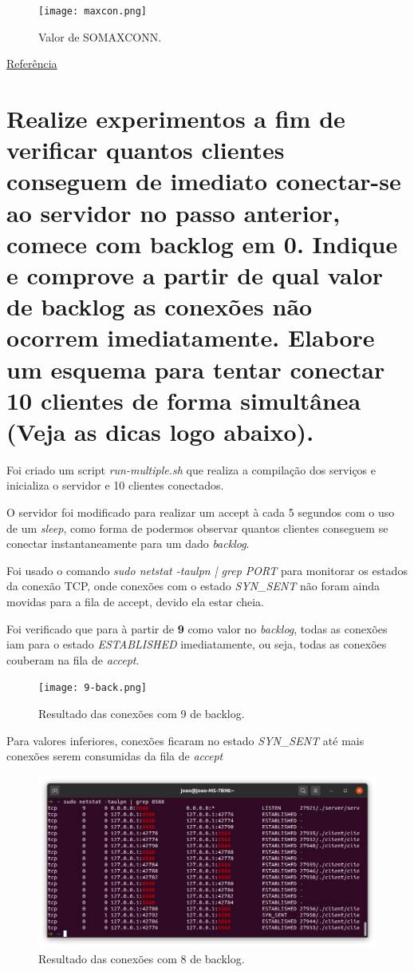 \documentclass[12pt,a4paper]{report}
\begin{document}
\begin{figure}[H]
  \texttt{[image: maxcon.png]}
  \caption{Valor de SOMAXCONN.}
\end{figure}

\href{http://veithen.io/2014/01/01/how-tcp-backlog-works-in-linux.html}{Referência}

\section{Realize experimentos a fim de verificar quantos clientes conseguem de imediato
conectar-se ao servidor no passo anterior, comece com backlog em 0. Indique e
comprove a partir de qual valor de backlog as conexões não ocorrem imediatamente.
Elabore um esquema para tentar conectar 10 clientes de forma simultânea (Veja as
dicas logo abaixo).}

Foi criado um script \emph{run-multiple.sh} que realiza a compilação dos serviços e inicializa o servidor e 10 clientes conectados.

O servidor foi modificado para realizar um accept à cada 5 segundos com o uso de um \emph{sleep}, como forma de podermos observar quantos clientes conseguem se conectar instantaneamente para um dado \emph{backlog}.

Foi usado o comando \emph{sudo netstat -taulpn | grep PORT} para monitorar os estados da conexão TCP, onde conexões com o estado \emph{SYN\_SENT} não foram ainda movidas para a fila de accept, devido ela estar cheia.

Foi verificado que para à partir de \textbf{9} como valor no \emph{backlog}, todas as conexões iam para o estado \emph{ESTABLISHED} imediatamente, ou seja, todas as conexões couberam na fila de \emph{accept}.

\begin{figure}[H]
  \texttt{[image: 9-back.png]}
  \caption{Resultado das conexões com 9 de backlog.}
\end{figure}

Para valores inferiores, conexões ficaram no estado \emph{SYN\_SENT} até mais conexões serem consumidas da fila de \emph{accept}

\begin{figure}[H]
  \includegraphics[width=\linewidth]{8back.png}
  \caption{Resultado das conexões com 8 de backlog.}
\end{figure}
\end{document}

